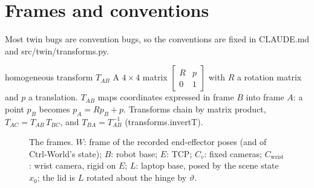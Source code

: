 \documentclass[11pt,a4paper]{article}
\newcommand{\code}[1]{{\small\ttfamily\begingroup\def\_{\textunderscore\allowbreak}\def\/{/\allowbreak}#1\endgroup}}
\begin{document}
\section{Frames and conventions}\label{sec:frames}
Most twin bugs are convention bugs, so the conventions are fixed in \code{CLAUDE.md} and \code{src\/twin\/transforms.py}.

\begin{newc}{homogeneous transform $T_{AB}$}
A $4\times4$ matrix $\begin{bmatrix}R&p\\0&1\end{bmatrix}$ with $R$ a rotation matrix and $p$ a translation. $T_{AB}$ maps coordinates expressed in frame $B$ into frame $A$: a point $p_B$ becomes $p_A=Rp_B+p$. Transforms chain by matrix product, $T_{AC}=T_{AB}\,T_{BC}$, and $T_{BA}=T_{AB}^{-1}$ (\code{transforms.invert\_T}).
\end{newc}

\begin{figure}[h]
\centering
{}
\caption{The frames. $W$: frame of the recorded end-effector poses (and of Ctrl-World's state); $B$: robot base; $E$: TCP; $C_v$: fixed cameras; $C_{\text{wrist}}$: wrist camera, rigid on $E$; $L$: laptop base, posed by the scene state $x_0$; the lid is $L$ rotated about the hinge by $\vartheta$.}
\label{fig:frames}
\end{figure}
\end{document}
